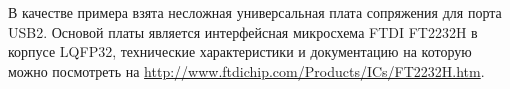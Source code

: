 В качестве примера взята несложная универсальная плата сопряжения для порта
USB2.
Основой платы является интерфейсная микросхема FTDI FT2232H  
в корпусе LQFP32, технические характеристики и документацию на которую можно
посмотреть на \url{http://www.ftdichip.com/Products/ICs/FT2232H.htm}.

